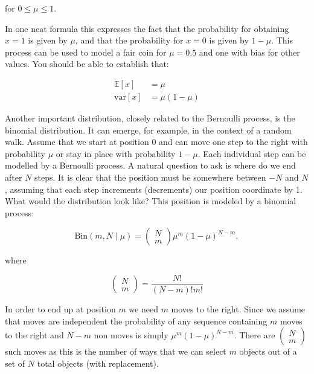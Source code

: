 for $0 \le \mu \le 1$.
  
In one neat formula this expresses the fact that the probability for obtaining $x=1$ is given by $\mu$, and that the probability for $x=0$ is given by $1 - \mu$. This
process can be used to model  a fair coin for $\mu = 0.5$ and one with bias for other values.
You should be able to establish that:

\begin{align}
\mathbb{E}[x] & = \mu \\
\mbox{var}[x] & = \mu(1 - \mu) \nonumber
\end{align}

Another important distribution, closely related to the Bernoulli process, is the binomial distribution. It can emerge, for example, in the context of a random walk. Assume
that we start at position 0 and can move one step to the right with probability $\mu$ or stay in place with probability $1 - \mu$. Each individual step can be modelled by a Bernoulli process. A natural question to ask is where do we end after $N$ steps. It is clear that the position must be somewhere between $-N$ and $N$, assuming that each step increments (decrements) our position coordinate by 1. What would the distribution look like? This position is modeled by a binomial process:

\begin{equation}
\mbox{Bin}(m,N \mid \mu) = \left( \begin{array}{c} N \\ m \end{array} \right) \mu^m(1- \mu)^{N-m}, 
\end{equation}

where

\begin{equation}
\left( \begin{array}{c} N \\ m \end{array} \right) = \frac{N!}{(N-m)!m!}
\end{equation}

In order to end up at position $m$ we need $m$ moves to the right. Since we assume that moves are independent the probability of any
sequence containing $m$ moves to the right and $N-m$ non moves
is simply $\mu^m(1-\mu)^{N-m}$. There are $\left( \begin{array}{c} N \\ m \end{array} \right)$
such moves as this is the number of ways that we can select $m$ objects out of a set of $N$ total objects (with replacement).


